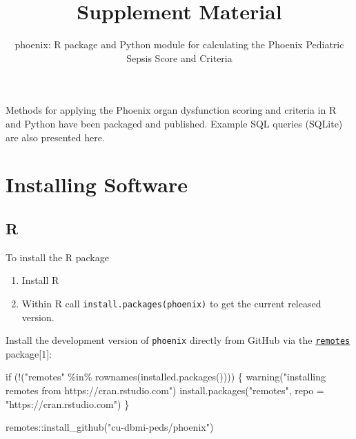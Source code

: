 \documentclass[
  letterpaper,
  DIV=11,
  numbers=noendperiod]{scrartcl}
\title{Supplement Material}
\subtitle{phoenix: R package and Python module for calculating the
Phoenix Pediatric Sepsis Score and Criteria}
\author{}
\date{}
\newenvironment{Shaded}{\begin{snugshade}}{\end{snugshade}}
\newcommand{\AttributeTok}[1]{\textcolor[rgb]{0.40,0.45,0.13}{#1}}
\newcommand{\ControlFlowTok}[1]{\textcolor[rgb]{0.00,0.23,0.31}{#1}}
\newcommand{\FunctionTok}[1]{\textcolor[rgb]{0.28,0.35,0.67}{#1}}
\newcommand{\NormalTok}[1]{\textcolor[rgb]{0.00,0.23,0.31}{#1}}
\newcommand{\SpecialCharTok}[1]{\textcolor[rgb]{0.37,0.37,0.37}{#1}}
\newcommand{\StringTok}[1]{\textcolor[rgb]{0.13,0.47,0.30}{#1}}
\providecommand{\tightlist}{%
  \setlength{\itemsep}{0pt}\setlength{\parskip}{0pt}}\usepackage{longtable,booktabs,array}
\renewcommand*\contentsname{Table of contents}
\newcommand\contentsname{Table of contents}
\begin{document}
\maketitle

\renewcommand*\contentsname{Table of contents}
{
\hypersetup{linkcolor=}
\setcounter{tocdepth}{3}
\tableofcontents
}
\newpage{}

Methods for applying the Phoenix organ dysfunction scoring and criteria
in R and Python have been packaged and published. Example SQL queries
(SQLite) are also presented here.

\section{Installing Software}\label{installing-software}

\subsection{R}\label{r}

To install the R package

\begin{enumerate}
\def\labelenumi{\arabic{enumi}.}
\tightlist
\item
  Install R
\item
  Within R call
  \texttt{install.packages(\textquotesingle{}phoenix\textquotesingle{})}
  to get the current released version.
\end{enumerate}

Install the development version of \texttt{phoenix} directly from GitHub
via the \href{https://github.com/r-lib/remotes/}{\texttt{remotes}}
package{[}1{]}:

\begin{Shaded}
\begin{Highlighting}[]
\ControlFlowTok{if}\NormalTok{ (}\SpecialCharTok{!}\NormalTok{(}\StringTok{"remotes"} \SpecialCharTok{\%in\%} \FunctionTok{rownames}\NormalTok{(}\FunctionTok{installed.packages}\NormalTok{()))) \{}
  \FunctionTok{warning}\NormalTok{(}\StringTok{"installing remotes from https://cran.rstudio.com"}\NormalTok{)}
  \FunctionTok{install.packages}\NormalTok{(}\StringTok{"remotes"}\NormalTok{, }\AttributeTok{repo =} \StringTok{"https://cran.rstudio.com"}\NormalTok{)}
\NormalTok{\}}

\NormalTok{remotes}\SpecialCharTok{::}\FunctionTok{install\_github}\NormalTok{(}\StringTok{"cu{-}dbmi{-}peds/phoenix"}\NormalTok{)}
\end{Highlighting}
\end{Shaded}
\end{document}
